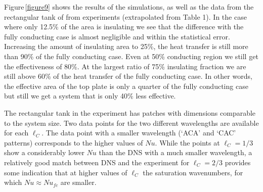 { Figure\,\ref{figure9} shows the results of the simulations, as well 
as the data from the rectangular tank of from experiments \citep{Wang2017}
(extrapolated from Table 1).}
In the case where
only 12.5\% of the area is insulating we see that the difference with the fully
conducting case is almost negligible and within the statistical error.
Increasing the amount of insulating area to 25\%, the heat transfer is still
more than 90\% of the fully conducting case.  Even at 50\% conducting region
we still get the effectiveness of 80\%.  At the largest ratio of 75\%
insulating fraction we are still above 60\% of the heat transfer of the fully
conducting case.  In other words, the effective area of the top plate is only
a quarter of the fully conducting case but still we get a system that is only
40\% less effective. 

{ The rectangular tank in the experiment \citep{Wang2017} has patches 
with dimensions comparable to the system size. Two data points for the
two different
wavelengths are available for each $\ell_C$. 
The data point with a smaller wavelength (`ACA' and `CAC' patterns)
corresponds to the higher values of $Nu$. While
the points at $\ell_C=1/3$ show a considerably lower $Nu$ 
than the DNS with a much smaller wavelength, 
a relatively good match between DNS and the experiment 
for $\ell_C=2/3$ provides some indication that at higher 
values of $\ell_C$ the saturation wavenumbers, for which $Nu \approx Nu_{fc}$ 
are smaller.}

